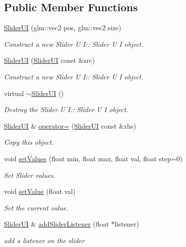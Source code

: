 \subsection*{Public Member Functions}
\begin{DoxyCompactItemize}
\item 
\hyperlink{class_slider_u_i_a53ec86dc88ad99b9c9d6f3e80c198db4}{Slider\+UI} (glm\+::vec2 pos, glm\+::vec2 size)
\begin{DoxyCompactList}\small\item\em Construct a new Slider U I\+:\+: Slider U I object. \end{DoxyCompactList}\item 
\hyperlink{class_slider_u_i_ab9d0d8254c52a745fc80ddecb86fdcc8}{Slider\+UI} (\hyperlink{class_slider_u_i}{Slider\+UI} const \&src)
\begin{DoxyCompactList}\small\item\em Construct a new Slider U I\+:\+: Slider U I object. \end{DoxyCompactList}\item 
\mbox{\label{class_slider_u_i_aa06ae51644f161b566963c022d560d4e}} 
virtual \hyperlink{class_slider_u_i_aa06ae51644f161b566963c022d560d4e}{$\sim$\+Slider\+UI} ()
\begin{DoxyCompactList}\small\item\em Destroy the Slider U I\+:\+: Slider U I object. \end{DoxyCompactList}\item 
\hyperlink{class_slider_u_i}{Slider\+UI} \& \hyperlink{class_slider_u_i_a69de2528b6428c341572667a4154e1c9}{operator=} (\hyperlink{class_slider_u_i}{Slider\+UI} const \&rhs)
\begin{DoxyCompactList}\small\item\em Copy this object. \end{DoxyCompactList}\item 
void \hyperlink{class_slider_u_i_abacedfdcf71faa74284e7f2566a68eeb}{set\+Values} (float min, float max, float val, float step=0)
\begin{DoxyCompactList}\small\item\em Set Slider values. \end{DoxyCompactList}\item 
void \hyperlink{class_slider_u_i_a39355d504aea20ce9b32053eea3e0e97}{set\+Value} (float val)
\begin{DoxyCompactList}\small\item\em Set the current value. \end{DoxyCompactList}\item 
\hyperlink{class_slider_u_i}{Slider\+UI} \& \hyperlink{class_slider_u_i_a10fa6883edf4a3bc6a089738df191183}{add\+Slider\+Listener} (float $\ast$listener)
\begin{DoxyCompactList}\small\item\em add a listener on the slider \end{DoxyCompactList}\end{DoxyCompactItemize}
